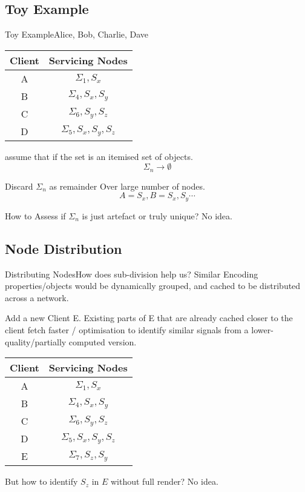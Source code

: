 \documentclass[nocontents]{beamer}
\begin{document}
	\subsection{Toy Example}
  \begin{frame}[t]{Toy Example}{Alice, Bob, Charlie, Dave}
    \vspace{.1cm}
    \begin{tabular}{|c|c|}
      \hline
      Client & Servicing Nodes \\
      \hline
      A & $\Sigma_{1},S_{x}$ \\
      B & $\Sigma_{4},S_{x},S_{y}$\\
      C & $\Sigma_{6},S_{y},S_{z}$\\
      D & $\Sigma_{5},S_{x},S_{y},S_{z}$\\
      \hline
    \end{tabular}
    \pause
    \begin{theorem}
      assume that if the set is  an itemised set of objects.
      \[\Sigma_{n} \to \emptyset \]

      Discard $\Sigma_{n}$ as remainder Over large number of nodes.
      \[ A = {S_{x}}, B = {S_{x},S_{y}} \cdots\]
      \pause

      How to Assess if $\Sigma_{n}$ is just artefact or truly unique? No idea.
    \end{theorem}
  \end{frame}
	\subsection{Node Distribution }
  \begin{frame}[t]{Distributing Nodes}{How does sub-division help us?}
    Similar Encoding properties/objects would be dynamically grouped, and cached to be distributed across a network.
    \pause
    \begin{example}


    Add a new Client E. Existing parts of E that are already cached closer to the client fetch faster / optimisation to identify similar signals from a lower-quality/partially computed version.

    \vspace{.2cm}

    \begin{tabular}{|c|c|}
      \hline
      Client & Servicing Nodes \\
      \hline
      A & $\Sigma_{1},S_{x}$ \\
      B & $\Sigma_{4},S_{x},S_{y}$\\
      C & $\Sigma_{6},S_{y},S_{z}$\\
      D & $\Sigma_{5},S_{x},S_{y},S_{z}$\\
      \hline
      E & $\Sigma_{7},S_{z},S_{y}$\\
          \hline
    \end{tabular}
  \end{example}
  \pause

  But how to identify $S_{z}$ in $E$ without full render? No idea.

\end{frame}
\end{document}
